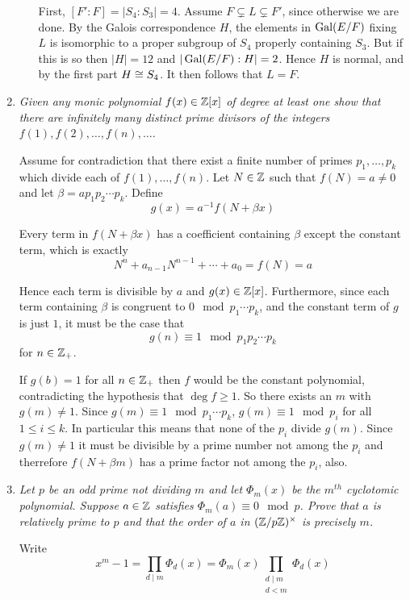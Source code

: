\documentclass[10pt]{article}
\begin{document}
\begin{enumerate}
\begin{enumerate}
First, $[F':F] = |S_4:S_3| = 4$.  Assume $F \subsetneq L \subsetneq F'$, since otherwise we are done.  By the Galois correspondence $H$, the elements in $\operatorname{Gal}(E/F)$ fixing $L$ is isomorphic to a proper subgroup of $S_4$ properly containing $S_3$.  But if this is so then $|H| = 12$ and $|\operatorname{Gal}(E/F):H| = 2$.  Hence $H$ is normal, and by the first part $H \cong S_4$.  It then follows that $L = F$.

\end{enumerate}


\item \emph{Given any monic polynomial $f(x) \in \mathbb{Z}[x]$ of degree at least one show that there are infinitely many distinct prime divisors of the integers $f(1), f(2), \ldots, f(n), \ldots$.}

Assume for contradiction that there exist a finite number of primes $p_1, \ldots, p_k$ which divide each of $f(1), \ldots, f(n)$.  Let $N \in \mathbb{Z}$ such that $f(N) = a \neq 0$ and let $\beta = a p_1 p_2 \cdots p_k$.  Define
\[
g(x) = a^{-1}f\left(N + \beta x\right)
\]

Every term in $f\left(N + \beta x\right)$ has a coefficient containing $\beta$ except the constant term, which is exactly
\[
N^n + a_{n-1}N^{n-1} + \cdots + a_0 = f(N) = a
\]

Hence each term is divisible by $a$ and $g(x) \in \mathbb{Z}[x]$.  Furthermore, since each term containing $\beta$ is congruent to $0 \mod p_1 \cdots p_k$, and the constant term of $g$ is just $1$, it must be the case that $$g(n) \equiv 1 \mod p_1 p_2 \cdots p_k$$ for $n \in \mathbb{Z}_+$.

If $g(b) = 1$ for all $n \in \mathbb{Z}_+$ then $f$ would be the constant polynomial, contradicting the hypothesis that $\deg f \geq 1$.  So there exists an $m$ with $g(m) \neq 1$.  Since $g(m) \equiv 1 \mod p_1 \cdots p_k$, $g(m) \equiv 1 \mod p_i$ for all $1 \leq i \leq k$.  In particular this means that none of the $p_i$ divide $g(m)$.  Since $g(m) \neq 1$ it must be divisible by a prime number not among the $p_i$ and therrefore $f\left(N + \beta m\right)$ has a prime factor not among the $p_i$, also.

\item \emph{Let $p$ be an odd prime not dividing $m$ and let $\Phi_m(x)$ be the $m^{th}$ cyclotomic polynomial.  Suppose $a \in \mathbb{Z}$ satisfies $\Phi_m(a) \equiv 0 \mod p$.  Prove that $a$ is relatively prime to $p$ and that the order of $a$ in $(\mathbb{Z}/p\mathbb{Z})^\times$ is precisely $m$.}

Write
\[
x^m - 1 = \prod_{d \mid m} \Phi_d(x) = \Phi_m(x) \prod_{\substack{d \mid m \\ d < m}} \Phi_d(x)
\]



\end{enumerate}
\end{document}

